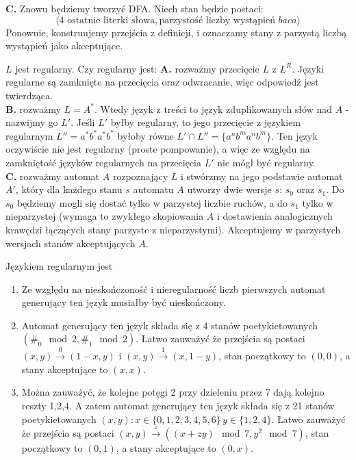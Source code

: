 \begin{solutions}
    \textbf{C.} Znowu będziemy tworzyć DFA. Niech stan będzie postaci:
        $$\langle \text{4 ostatnie literki słowa}, \text{parzystość liczby wystąpień } baca\rangle$$
        Ponownie, konstruujemy przejścia z definicji, i oznaczamy stany z parzystą liczbą wystąpień jako akceptujące.

    \sol $L$ jest regularny. Czy regularny jest:
    \textbf{A.} rozważmy przecięcie $L$ z $L^R$. Języki regularne są zamknięte na przecięcia oraz odwracanie, więc odpowiedź jest twierdząca. \\
    \textbf{B.} rozważmy $L = A^*$. Wtedy język z treści to język zduplikowanych słów nad $A$ - nazwijmy go $L'$. Jeśli $L'$ byłby regularny, to jego przecięcie z językiem regularnym $L'' = a^*b^*a^*b^*$ byłoby równe $L' \cap L'' = \{a^nb^ma^nb^m\}$. Ten język oczywiście nie jest regularny (proste pompowanie), a więc ze względu na zamkniętość języków regularnych na przecięcia $L'$ nie mógł być regularny. \\
    \textbf{C.} rozważmy automat $A$ rozpoznający $L$ i stwórzmy na jego podstawie automat $A'$, który dla każdego stanu $s$ automatu $A$ utworzy dwie wersje $s$: $s_0$ oraz $s_1$. Do $s_0$ będziemy mogli się dostać tylko w parzystej liczbie ruchów, a do $s_1$ tylko w nieparzystej (wymaga to zwykłego skopiowania $A$ i dostawienia analogicznych krawędzi łączących stany parzyste z nieparzystymi). Akceptujemy w parzystych wersjach stanów akceptujących $A$.

    \sol Językiem regularnym jest

    \begin{enumerate}[\bf A.]
        \item Ze względu na nieskończoność i nieregularność liczb pierwszych automat generujący ten język musiałby być nieskończony.
        \item Automat generujący ten język składa się z 4 stanów poetykietowanych $(\#_0 \mod 2, \#_1 \mod 2)$. Łatwo zauważyć że przejścia są postaci $(x, y) \xrightarrow{0} (1-x, y)$ i $(x, y) \xrightarrow{1} (x, 1- y)$, stan początkowy to $(0, 0)$, a stany akceptujące to $(x,x)$.
        \item Można zauważyć, że kolejne potęgi 2 przy dzieleniu przez 7 dają kolejno reszty 1,2,4. A zatem automat generujący ten język składa się z 21 stanów poetykietowanych $(x, y) : x \in \{0,1,2,3,4,5,6\}\, y \in \{1,2,4\}$. Łatwo zauważyć że przejścia są postaci $(x, y) \xrightarrow{z} ((x + zy) \mod 7, y^2 \mod 7)$, stan początkowy to $(0, 1)$, a stany akceptujące to $(0,x)$.
    \end{enumerate}


\end{solutions}

